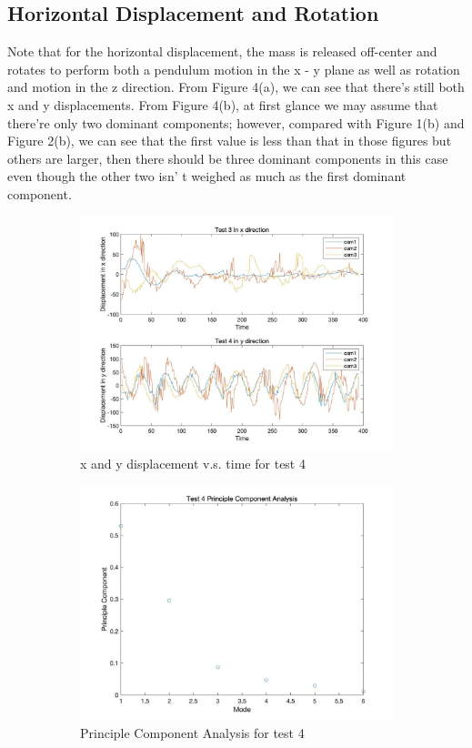 \documentclass[12pt,letterpaper]{article}
\begin{document}
\subsection*{Horizontal Displacement and Rotation}
Note that for the horizontal displacement, the mass is released off-center and rotates to perform both a pendulum motion in the x - y plane as well as rotation and motion in the z direction. From Figure 4(a), we can see that there's still both x and y displacements. From Figure 4(b), at first glance we may assume that there're only two dominant components; however, compared with Figure 1(b) and Figure 2(b), we can see that the first value is less than that in those figures but others are larger, then there should be three dominant components in this case even though the other two isn' t weighed as much as the first dominant component. 
\begin{figure}[ht]
\begin{subfigure}{.5\textwidth}
  \centering
  \includegraphics[width=0.9\linewidth]{4-a.jpg}  
  \caption{x and y displacement v.s. time for test 4}
  \label{fig:sub-first}
\end{subfigure}
\begin{subfigure}{.5\textwidth}
  \centering
  \includegraphics[width=0.9\linewidth]{4-b.jpg}  
  \caption{Principle Component Analysis for test 4}
  \label{fig:sub-second}
\end{subfigure}
\label{fig:fig}
\caption{}
\end{figure}
\end{document}
